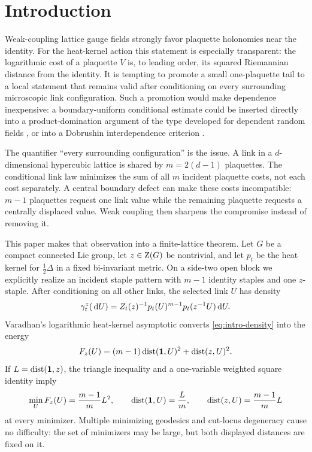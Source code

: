 \section{Introduction}

Weak-coupling lattice gauge fields strongly favor plaquette holonomies near
the identity.  For the heat-kernel action this statement is especially
transparent: the logarithmic cost of a plaquette $V$ is, to leading order,
its squared Riemannian distance from the identity.  It is tempting to promote
a small one-plaquette tail to a local statement that remains valid after
conditioning on every surrounding microscopic link configuration.  Such a
promotion would make dependence inexpensive: a boundary-uniform conditional
estimate could be inserted directly into a product-domination argument of
the type developed for dependent random fields
\cite{LiggettSchonmannStacey1997}, or into a Dobrushin interdependence
criterion \cite{Dobrushin1968}.

The quantifier ``every surrounding configuration'' is the issue.  A link in
a $d$-dimensional hypercubic lattice is shared by $m=2(d-1)$ plaquettes.  The
conditional link law minimizes the sum of all $m$ incident plaquette costs,
not each cost separately.  A central boundary defect can make these costs
incompatible: $m-1$ plaquettes request one link value while the remaining
plaquette requests a centrally displaced value.  Weak coupling then sharpens
the compromise instead of removing it.

This paper makes that observation into a finite-lattice theorem.  Let $G$ be
a compact connected Lie group, let $z\in\mathrm Z(G)$ be nontrivial, and let $p_t$
be the heat kernel for $\tfrac12\Delta$ in a fixed bi-invariant metric.  On a
side-two open block we explicitly realize an incident staple pattern with
$m-1$ identity staples and one $z$-staple.  After conditioning on all other
links, the selected link $U$ has density
\begin{equation}\label{eq:intro-density}
  \gamma_t^z(\,\mathrm d U)=Z_t(z)^{-1}p_t(U)^{m-1}p_t(z^{-1}U)\,\mathrm dU.
\end{equation}
Varadhan's logarithmic heat-kernel asymptotic
\cite{Varadhan1967Fundamental,Varadhan1967Diffusion} converts
\eqref{eq:intro-density} into the energy
\begin{equation}\label{eq:intro-energy}
  F_z(U)=(m-1)\operatorname{dist}(\mathbf 1,U)^2+\operatorname{dist}(z,U)^2.
\end{equation}
If $L=\operatorname{dist}(\mathbf 1,z)$, the triangle inequality and a one-variable weighted
square identity imply
\[
 \min_U F_z(U)=\frac{m-1}{m}L^2,
 \qquad
 \operatorname{dist}(\mathbf 1,U)=\frac Lm,
 \qquad
 \operatorname{dist}(z,U)=\frac{m-1}{m}L
\]
at every minimizer.  Multiple minimizing geodesics and cut-locus degeneracy
cause no difficulty: the set of minimizers may be large, but both displayed
distances are fixed on it.

